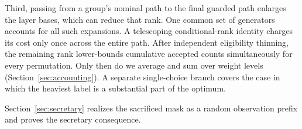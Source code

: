 Third, passing from a group's nominal path to the final guarded path
enlarges the layer bases, which can reduce that rank. One common set of generators accounts for all such
expansions. A telescoping conditional-rank identity charges its cost only
once across the entire path. After independent eligibility thinning,
the remaining rank lower-bounds cumulative accepted counts
simultaneously for every permutation. Only then do we average and sum
over weight levels (Section~\ref{sec:accounting}). A separate
single-choice branch covers the case in which the heaviest label is a
substantial part of the optimum.

Section~\ref{sec:secretary} realizes the sacrificed mask as a random
observation prefix and proves the secretary consequence.
